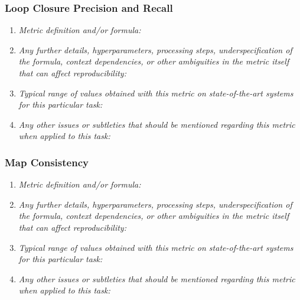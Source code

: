 \documentclass[a4paper,11pt]{article}
\begin{document}
        \subsubsection{Loop Closure Precision and Recall}
            \begin{enumerate}[label=\alph*.]
                \item \textit{Metric definition and/or formula:}
                \bigskip
                \item \textit{Any further details, hyperparameters, processing steps, underspecification of the formula, context dependencies, or other ambiguities in the metric itself that can affect reproducibility:}
                \bigskip
                \item \textit{Typical range of values obtained with this metric on state-of-the-art systems for this particular task:}
                \bigskip
                \item \textit{Any other issues or subtleties that should be mentioned regarding this metric when applied to this task:}
                \bigskip
            \end{enumerate}
        \subsubsection{Map Consistency}
            \begin{enumerate}[label=\alph*.]
                \item \textit{Metric definition and/or formula:}
                \bigskip
                \item \textit{Any further details, hyperparameters, processing steps, underspecification of the formula, context dependencies, or other ambiguities in the metric itself that can affect reproducibility:}
                \bigskip
                \item \textit{Typical range of values obtained with this metric on state-of-the-art systems for this particular task:}
                \bigskip
                \item \textit{Any other issues or subtleties that should be mentioned regarding this metric when applied to this task:}
                \bigskip
            \end{enumerate}
\end{document}

